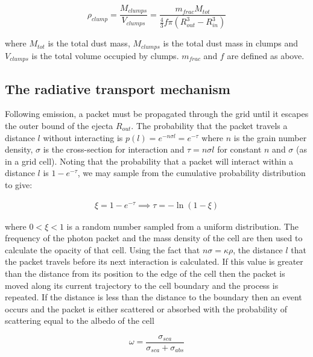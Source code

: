 \documentclass[useAMS,usenatbib,usegraphicx]{mnras}
\begin{document}
\begin{equation}
\rho_{clump}=\frac{M_{clumps}}{V_{clumps}}=\frac{m_{frac}M_{tot}}{\frac{4}{3} f\pi (R_{out}^{3}-R_{in}^{3} )}
\end{equation}

\noindent where $M_{tot}$ is the total dust mass, $M_{clumps}$ is the 
total dust mass in clumps and $V_{clumps}$ is the total volume occupied by 
clumps.  $m_{frac}$ and $f$ are defined as above.


\subsection{The radiative transport mechanism}
\label{transport}

Following emission, a packet must be propagated through the grid until it 
escapes the outer bound of the ejecta $R_{out}$.  The probability that the 
packet travels a distance $l$ without interacting is $p(l)=e ^{-n \sigma 
l}=e ^{-\tau} $ where $n$ is the grain number density, $\sigma$ is the 
cross-section for interaction and $ \tau = n\sigma l$ for constant $n$ and 
$\sigma$ (as in a grid cell).  Noting that the probability that a packet 
will interact within a distance $l$ is $1-e^{-\tau}$, we may 
sample from the cumulative probability distribution to give:

\begin{align}
\xi = 1 - e^{-\tau} \implies \tau= -\ln (1-\xi)
\end{align}

\noindent where $0<\xi<1$ is a  random number sampled from a uniform distribution.
The frequency of the 
photon packet and the mass density of the cell are then used to calculate 
the opacity of that cell. Using the fact that $n\sigma=\kappa\rho$, 
the distance $l$ that the packet travels before its next interaction is 
calculated.  If this value is greater than the distance from its position 
to the edge of the cell then the packet is moved along its current 
trajectory to the cell boundary and the process is repeated.  If the 
distance is less than the distance to the boundary then an event occurs 
and the packet is either scattered or absorbed with the probability of 
scattering equal to the albedo of the cell

\begin{equation}
	\omega=\frac{\sigma_{sca}}{\sigma_{sca}+\sigma_{abs}}
\end{equation}
\end{document}
